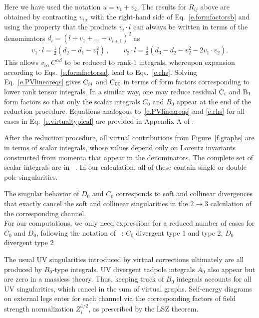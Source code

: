 \documentclass[prd,preprintnumbers,nofootinbib,superscriptaddress,onecolumn,preprint]{revtex4-1}
\newcommand\3[1]{\boldsymbol{#1}}
\begin{document}
Here we have used the notation $u = v_1 + v_2$.  The results for
$R_{ij}$ above are obtained by contracting $v_i{}_\alpha$ with the
right-hand side of Eq.~\eqref{e.formfactorsb} and using the property
that the products $v_i\cdot l$ can always be written in terms of the
denominators $d_i=(l+v_1+...+v_{i+1})^2$ as
%
\begin{align}
v_1\cdot l=\frac{1}{2}\left(d_2-d_1-v_1^2\right)\, , \qquad
v_2\cdot l=\frac{1}{2}\left(d_3-d_2-v_2^2-2v_1\cdot v_2\right).
\label{e.kdotpi}
\end{align}
%
This allows $v_i{}_\alpha \, C^{\alpha\beta}$ to be reduced to rank-1
integrals, whereupon expansion according to
Eqs.~\eqref{e.formfactorsa}, lead to Eqs.~\eqref{e.rhs}. Solving
Eq.~\eqref{e.PVlineareqs} gives ${\rm C}_{ij}$ and ${\rm C}_{00}$ in
terms of form factors corresponding to lower rank tensor integrals. In
a similar way, one may reduce residual ${\rm C}_i$ and ${\rm B}_1$
form factors so that only the scalar integrals $C_0$ and $B_0$ appear at the end of the
reduction procedure. Equations analogous to~\eqref{e.PVlineareqs} and
\eqref{e.rhs} for all cases in Eq.~\eqref{e.virtualtypical} are
provided in Appendix A of \cite{Ellis:2011cr}.

After the reduction procedure, all virtual contributions from
Figure~\ref{f.graphs} are  in terms of scalar integrals, whose values
depend only on Lorentz invariants constructed from momenta that appear
in the denominators. The complete set of scalar integrals are in
~\cite{Ellis:2007qk}.  In our calculation, all of these contain single
or double pole singularities. 

The singular behavior of $D_0$ and $C_0$ corresponds to soft
and collinear divergences that exactly cancel the soft and
collinear singularities in the $2 \to 3$ calculation of the
corresponding channel. \\

For our computations, we only need expressions for a reduced number of
cases for $C_0$ and $D_0$, following the notation of
~\cite{Ellis:2007qk}: $C_0$ divergent type 1 and type 2, $D_0$ divergent type 2 

The usual UV singularities introduced by virtual corrections ultimately are 
all produced by $B_0$-type integrals. UV divergent tadpole integrals $A_0$ also appear 
but are zero in a massless theory. Thus, keeping track of $B_0$ integrals accounts for all 
UV singularities, which cancel in the sum of virtual graphs. Self-energy diagrams on 
external legs enter for each channel via the corresponding factors of field strength 
normalization $Z_i^{1/2}$, as prescribed by the LSZ theorem. \\
\end{document}

